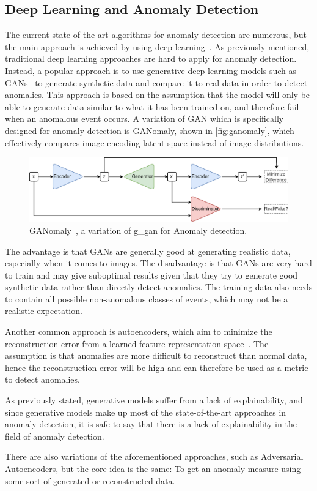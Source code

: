 \subsection{Deep Learning and Anomaly Detection}
\label{sec:dl_anom_detection}
The current state-of-the-art algorithms for anomaly detection are numerous, but the main approach is achieved by using deep learning~\cite{anomaly_detection}. As previously mentioned, traditional deep learning approaches are hard to apply for anomaly detection. Instead, a popular approach is to use generative deep learning models such as GANs~\cite{anomaly_detection, ganomaly,anomalyvideo} to generate synthetic data and compare it to real data in order to detect anomalies. This approach is based on the assumption that the model will only be able to generate data similar to what it has been trained on, and therefore fail when an anomalous event occurs. A variation of GAN which is specifically designed for anomaly detection is GANomaly\cite{ganomaly}, shown in \autoref{fig:ganomaly}, which effectively compares image encoding latent space instead of image distributions.
\begin{figure}[H]
    \centering
    \includegraphics[width=\linewidth]{resources/related_works/ganomaly}
    \caption[GANomaly Visualization]{GANomaly~\cite{ganomaly}, a variation of \gls*{g_gan} for Anomaly detection.}
    \label{fig:ganomaly}
\end{figure}
The advantage is that GANs are generally good at generating realistic data, especially when it comes to images. The disadvantage is that GANs are very hard to train and may give suboptimal results given that they try to generate good synthetic data rather than directly detect anomalies. The training data also needs to contain all possible non-anomalous classes of events, which may not be a realistic expectation.
\par

Another common approach is autoencoders, which aim to minimize the reconstruction error from a learned feature representation space~\cite{autoencoder1,anomaly_detection,anomalyvideo}. The assumption is that anomalies are more difficult to reconstruct than normal data, hence the reconstruction error will be high and can therefore be used as a metric to detect anomalies.
\par
As previously stated, generative models suffer from a lack of explainability, and since generative models make up most of the state-of-the-art approaches in anomaly detection, it is safe to say that there is a lack of explainability in the field of anomaly detection.
\par
There are also variations of the aforementioned approaches, such as Adversarial Autoencoders, but the core idea is the same: To get an anomaly measure using some sort of generated or reconstructed data.
